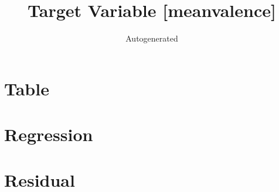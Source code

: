 \documentclass[a3paper, 11pt]{article}
\title{Target Variable [meanvalence]}
\author{Autogenerated}
\begin{document}
\maketitle

\section{Table}


\clearpage

\section{Regression}


\clearpage

\section{Residual}

\end{document}
